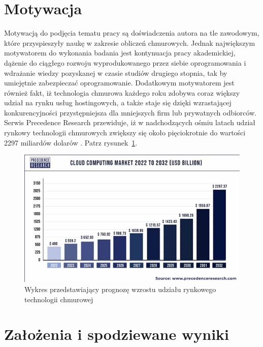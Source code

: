 \documentclass[12pt,twoside]{book}
\newcommand{\captionvspace}{\vspace{6pt}}
\begin{document}
    \section{Motywacja}

    Motywacją do podjęcia tematu pracy są doświadczenia autora na tle zawodowym, które przyspieszyły naukę w zakresie obliczeń chmurowych. Jednak największym motywatorem do wykonania badania jest kontynuacja pracy akademickiej, dążenie do ciągłego rozwoju wyprodukowanego przez siebie oprogramowania i wdrażanie wiedzy pozyskanej w czasie studiów drugiego stopnia, tak by umiejętnie zabezpieczać oprogramowanie. Dodatkowym motywatorem jest również fakt, iż technologia chmurowa każdego roku zdobywa coraz większy udział na rynku usług hostingowych, a także staje się dzięki wzrastającej konkurencyjności przystępniejsza dla mniejszych firm lub prywatnych odbiorców. Serwis Precedence Research przewiduje, iż w nadchodzących ośmiu latach udział rynkowy technologii chmurowych zwiększy się około pięciokrotnie do wartości 2297 miliardów dolarów \cite{p.research}. Patrz rysunek~\ref{fig:precedence-research}.

    \begin{figure}[ht]
        \centering
        \includegraphics[width=\textwidth]{includes/images/precedence-research.png}
        \captionvspace
        \caption{Wykres przedstawiający prognozę wzrostu udziału rynkowego technologii chmurowej}
        \label{fig:precedence-research}
    \end{figure}


    \section{Założenia i spodziewane wyniki}
\end{document}

